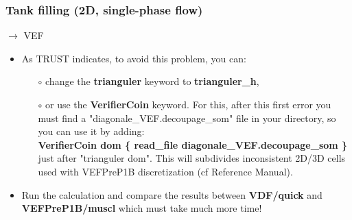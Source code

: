 \documentclass[10pt, hyperref={unicode=true,pdfusetitle, bookmarks=true,bookmarksnumbered=false,bookmarksopen=false, breaklinks=false,pdfborder={0 0 1},backref=true,colorlinks=true,linkcolor=darkblue,pageanchor}]{beamer}
\begin{document}
\begin{frame}
\frametitle{Tank filling (2D, single-phase flow)}
\begin{block}{$\rightarrow$ VEF}

\begin{itemize}
\item As TRUST indicates, to avoid this problem, you can:
    \begin{itemize}
    \item [$\circ$] change the \textbf{trianguler} keyword to \textbf{trianguler\_h}, 
    \item [$\circ$] or use the \textbf{VerifierCoin} keyword. For this, after this first error you must find a "diagonale\_VEF.decoupage\_som" file in your directory, so you can use it by adding:\\
    \textbf{VerifierCoin dom \{ read\_file diagonale\_VEF.decoupage\_som \} }\\
    just after "trianguler dom". This will subdivides inconsistent 2D/3D cells used with VEFPreP1B discretization (cf Reference Manual).
    \end{itemize}

\item Run the calculation and compare the results between \textbf{VDF/quick} and \textbf{VEFPreP1B/muscl} which must take much more time!
\end{itemize}

\end{block}
\end{frame}
\end{document}
